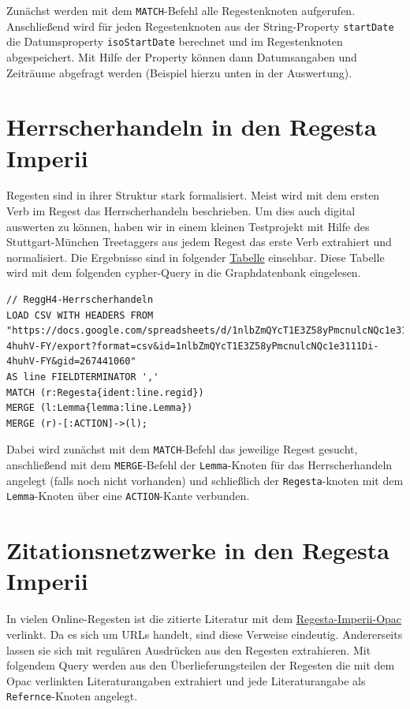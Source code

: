 \documentclass[ngerman,]{scrreprt}
\begin{document}
Zunächst werden mit dem \texttt{MATCH}-Befehl alle Regestenknoten aufgerufen. Anschließend wird für jeden Regestenknoten aus der String-Property \texttt{startDate} die Datumsproperty \texttt{isoStartDate} berechnet und im Regestenknoten abgespeichert. Mit Hilfe der Property können dann Datumsangaben und Zeiträume abgefragt werden (Beispiel hierzu unten in der Auswertung).

\section{Herrscherhandeln in den Regesta Imperii}\label{herrscherhandeln-in-den-regesta-imperii}

Regesten sind in ihrer Struktur stark formalisiert. Meist wird mit dem ersten Verb im Regest das Herrscherhandeln beschrieben. Um dies auch digital auswerten zu können, haben wir in einem kleinen Testprojekt mit Hilfe des Stuttgart-München Treetaggers aus jedem Regest das erste Verb extrahiert und normalisiert. Die Ergebnisse sind in folgender \href{https://docs.google.com/spreadsheets/d/1nlbZmQYcT1E3Z58yPmcnulcNQc1e3111Di-4huhV-FY/edit?usp=sharing}{Tabelle} einsehbar. Diese Tabelle wird mit dem folgenden cypher-Query in die Graphdatenbank eingelesen.

\begin{verbatim}
// ReggH4-Herrscherhandeln
LOAD CSV WITH HEADERS FROM "https://docs.google.com/spreadsheets/d/1nlbZmQYcT1E3Z58yPmcnulcNQc1e3111Di-4huhV-FY/export?format=csv&id=1nlbZmQYcT1E3Z58yPmcnulcNQc1e3111Di-4huhV-FY&gid=267441060"
AS line FIELDTERMINATOR ','
MATCH (r:Regesta{ident:line.regid})
MERGE (l:Lemma{lemma:line.Lemma})
MERGE (r)-[:ACTION]->(l);
\end{verbatim}

Dabei wird zunächst mit dem \texttt{MATCH}-Befehl das jeweilige Regest gesucht, anschließend mit dem \texttt{MERGE}-Befehl der \texttt{Lemma}-Knoten für das Herrscherhandeln angelegt (falls noch nicht vorhanden) und schließlich der \texttt{Regesta}-knoten mit dem \texttt{Lemma}-Knoten über eine \texttt{ACTION}-Kante verbunden.

\section{Zitationsnetzwerke in den Regesta Imperii}\label{zitationsnetzwerke-in-den-regesta-imperii}

In vielen Online-Regesten ist die zitierte Literatur mit dem \href{http://opac.regesta-imperii.de/lang_de/}{Regesta-Imperii-Opac} verlinkt. Da es sich um URLs handelt, sind diese Verweise eindeutig. Andererseits lassen sie sich mit regulären Ausdrücken aus den Regesten extrahieren. Mit folgendem Query werden aus den Überlieferungsteilen der Regesten die mit dem Opac verlinkten Literaturangaben extrahiert und jede Literaturangabe als \texttt{Refernce}-Knoten angelegt.
\end{document}
